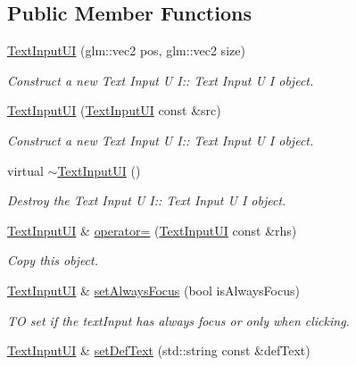 \subsection*{Public Member Functions}
\begin{DoxyCompactItemize}
\item 
\hyperlink{class_text_input_u_i_a502842551f51b722c7eb437d591b98f1}{Text\+Input\+UI} (glm\+::vec2 pos, glm\+::vec2 size)
\begin{DoxyCompactList}\small\item\em Construct a new Text Input U I\+:\+: Text Input U I object. \end{DoxyCompactList}\item 
\hyperlink{class_text_input_u_i_af8d8c50262fae80a16d80c958dcfc3a0}{Text\+Input\+UI} (\hyperlink{class_text_input_u_i}{Text\+Input\+UI} const \&src)
\begin{DoxyCompactList}\small\item\em Construct a new Text Input U I\+:\+: Text Input U I object. \end{DoxyCompactList}\item 
\mbox{\label{class_text_input_u_i_a47b6468d58e1097f2ab0f6eb108c6212}} 
virtual \hyperlink{class_text_input_u_i_a47b6468d58e1097f2ab0f6eb108c6212}{$\sim$\+Text\+Input\+UI} ()
\begin{DoxyCompactList}\small\item\em Destroy the Text Input U I\+:\+: Text Input U I object. \end{DoxyCompactList}\item 
\hyperlink{class_text_input_u_i}{Text\+Input\+UI} \& \hyperlink{class_text_input_u_i_a7d1436a384c86575aa7021d89c110964}{operator=} (\hyperlink{class_text_input_u_i}{Text\+Input\+UI} const \&rhs)
\begin{DoxyCompactList}\small\item\em Copy this object. \end{DoxyCompactList}\item 
\hyperlink{class_text_input_u_i}{Text\+Input\+UI} \& \hyperlink{class_text_input_u_i_ada177e3f531c6c8c827344615b64b9cb}{set\+Always\+Focus} (bool is\+Always\+Focus)
\begin{DoxyCompactList}\small\item\em TO set if the text\+Input has always focus or only when clicking. \end{DoxyCompactList}\item 
\hyperlink{class_text_input_u_i}{Text\+Input\+UI} \& \hyperlink{class_text_input_u_i_a7014056f5805634ed5ab0f107c14d581}{set\+Def\+Text} (std\+::string const \&def\+Text)

\end{DoxyCompactItemize}
